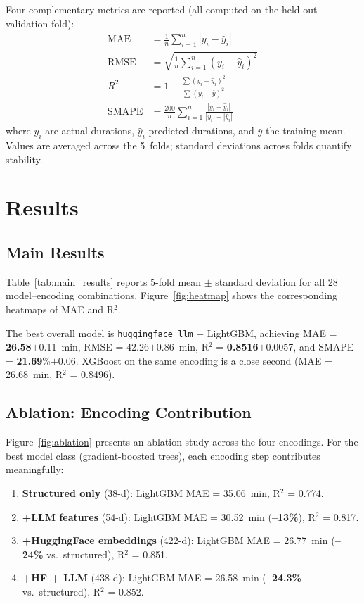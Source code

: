 \documentclass[11pt,twocolumn]{article}
\newcommand{\enc}[1]{\texttt{#1}}
\newcommand{\bestval}[1]{{\color{bestcol}\textbf{#1}}}
\begin{document}
Four complementary metrics are reported (all computed on the held-out validation
fold):
\begin{align}
\text{MAE}   &= \frac{1}{n}\sum_{i=1}^{n}|y_i - \hat{y}_i| \\
\text{RMSE}  &= \sqrt{\frac{1}{n}\sum_{i=1}^{n}(y_i - \hat{y}_i)^2} \\
R^2          &= 1 - \frac{\sum(y_i-\hat{y}_i)^2}{\sum(y_i-\bar{y})^2} \\
\text{SMAPE} &= \frac{200}{n}\sum_{i=1}^{n}
               \frac{|y_i-\hat{y}_i|}{|y_i|+|\hat{y}_i|}
\end{align}
where $y_i$ are actual durations, $\hat{y}_i$ predicted durations, and $\bar{y}$
the training mean.  Values are averaged across the 5~folds; standard deviations
across folds quantify stability.

\section{Results}
\label{sec:results}

\subsection{Main Results}

Table~\ref{tab:main_results} reports 5-fold mean $\pm$ standard deviation for all
28 model--encoding combinations.  Figure~\ref{fig:heatmap} shows the corresponding
heatmaps of MAE and R$^2$.

The best overall model is \enc{huggingface\_llm} + LightGBM, achieving
MAE = \bestval{26.58}$\pm$0.11~min, RMSE = 42.26$\pm$0.86~min,
R$^2$ = \bestval{0.8516}$\pm$0.0057, and SMAPE = \bestval{21.69}\%$\pm$0.06.
XGBoost on the same encoding is a close second
(MAE = 26.68~min, R$^2$ = 0.8496).

\subsection{Ablation: Encoding Contribution}
\label{sec:ablation}

Figure~\ref{fig:ablation} presents an ablation study across the four encodings.
For the best model class (gradient-boosted trees), each encoding step contributes
meaningfully:

\begin{enumerate}
  \item \textbf{Structured only} (38-d): LightGBM MAE = 35.06~min,
        R$^2$ = 0.774.
  \item \textbf{+LLM features} (54-d): LightGBM MAE = 30.52~min
        (\textbf{--13\%}), R$^2$ = 0.817.
  \item \textbf{+HuggingFace embeddings} (422-d): LightGBM MAE = 26.77~min
        (\textbf{--24\%} vs.\ structured), R$^2$ = 0.851.
  \item \textbf{+HF + LLM} (438-d): LightGBM MAE = 26.58~min
        (\textbf{--24.3\%} vs.\ structured), R$^2$ = 0.852.
\end{enumerate}
\end{document}
